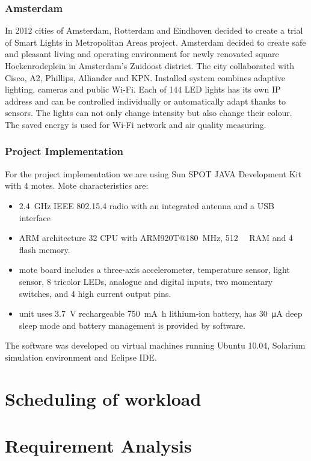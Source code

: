 \documentclass[UKenglish,10pt,a4paper]{report}
\begin{document}
\subsection{Amsterdam}
In 2012 cities of Amsterdam, Rotterdam and Eindhoven decided to create a trial of Smart Lights in Metropolitan Areas project. Amsterdam decided to create safe and pleasant living and operating environment for newly renovated square Hoekenrodeplein in Amsterdam's Zuidoost district. The city collaborated with Cisco, A2, Phillips, Alliander and KPN. Installed system combines adaptive lighting, cameras and public Wi-Fi. Each of 144 LED lights has its own IP address and can be controlled individually or automatically adapt thanks to sensors. The lights can not only change intensity but also change their colour. The saved energy is used for Wi-Fi network and air quality measuring.\cite{amsterdam, amsterdam2}
\subsection{Project Implementation}
For the project implementation we are using Sun SPOT JAVA Development Kit with 4 motes. Mote characteristics are:
\begin{itemize}
\item \SI{2.4}{\giga\hertz} IEEE 802.15.4 radio with an integrated antenna and a USB interface
\item ARM architecture \SI{32}{\bit} CPU with ARM920T@\SI{180}{\mega\hertz}, \SI{512}{\kilo\byte} RAM and \SI{4}{\mega\byte} flash memory.
\item mote board includes a three-axis accelerometer, temperature sensor, light sensor, 8 tricolor LEDs, analogue and digital inputs, two momentary switches, and 4 high current output pins.
\item unit uses \SI{3.7}{\volt} rechargeable \SI{750}{\milli\ampere\hour} lithium-ion battery, has \SI{30}{\micro\ampere} deep sleep mode and battery management is provided by software.
\end{itemize}
The software was developed on virtual machines running Ubuntu 10.04, Solarium simulation environment and Eclipse IDE.
\chapter{Scheduling of workload}

\chapter{Requirement Analysis}
\end{document}
